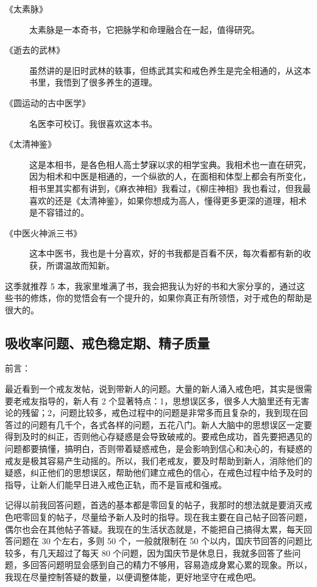 \documentclass{ctexart}
\begin{document}
\begin{description}
    \item[《太素脉》] 太素脉是一本奇书，它把脉学和命理融合在一起，值得研究。
    \item[《逝去的武林》] 虽然讲的是旧时武林的轶事，但练武其实和戒色养生是完全相通的，从这本书里，我悟到了很多养生的道理。
    \item[《圆运动的古中医学》] 名医李可校订。我很喜欢这本书。
    \item[《太清神鉴》] 这是本相书，是各色相人高士梦寐以求的相学宝典。我相术也一直在研究，因为相术和中医是相通的，一个纵欲的人，在面相和体型上都会有所变化，相书里其实都有讲到，《麻衣神相》我看过，《柳庄神相》我也看过，但我最喜欢的还是《太清神鉴》，如果你想成为高人，懂得更多更深的道理，相术是不容错过的。
    \item[《中医火神派三书》] 这本中医书，我也是十分喜欢，好的书我都是百看不厌，每次看都有新的收获，所谓温故而知新。
\end{description}

这季就推荐 5 本，我家里堆满了书，我会把我认为好的书和大家分享的，通过这些书的修炼，你的觉悟会有一个提升的，如果你真正有所领悟，对于戒色的帮助是很大的。

\subsection{吸收率问题、戒色稳定期、精子质量}

前言：

最近看到一个戒友发帖，说到带新人的问题。大量的新人涌入戒色吧，其实是很需要老戒友指导的，新人有 2 个显著特点：1，思想误区多，很多人大脑里还有无害论的残留；2，问题比较多，戒色过程中的问题是非常多而且复杂的，我到现在回答过的问题有几千个，各式各样的问题，五花八门。新人大脑中的思想误区一定要得到及时的纠正，否则他心存疑惑是会导致破戒的。要戒色成功，首先要把遇见的问题都要搞懂，搞明白，否则带着疑惑戒色，是会影响到信心和决心的，有疑惑的戒友是极其容易产生动摇的。所以，我们老戒友，要及时帮助到新人，消除他们的疑惑，纠正他们的思想误区，帮助他们建立戒色的信心，在戒色过程中给予及时的指导，让新人们能早日进入戒色正轨，而不是盲戒和强戒。

记得以前我回答问题，首选的基本都是零回复的帖子，我那时的想法就是要消灭戒色吧零回复的帖子，尽量给予新人及时的指导。现在我主要在自己帖子回答问题，偶尔也会在其他帖子答疑。我现在的生活状态就是，不能把自己搞得太累，每天回答问题在 30 个左右，多则 50 个，一般就限制在 50 个以内，国庆节回答的问题比较多，有几天超过了每天 80 个问题，因为国庆节是休息日，我就多回答了些问题，多回答问题明显会感到自己的精力不够用，容易造成身累心累的现象。所以，我现在尽量控制答疑的数量，以便调整体能，更好地坚守在戒色吧。
\end{document}
